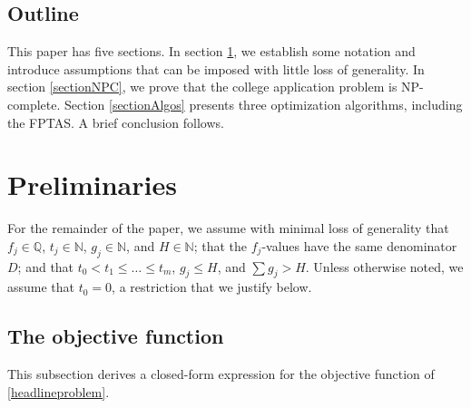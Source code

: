 \documentclass[11pt]{article} %
\theoremstyle{definition}
\begin{document}
\subsection{Outline}

This paper has five sections. In section \ref{sectionPrelims}, we establish some notation and introduce assumptions that can be imposed with little loss of generality. In section \ref{sectionNPC}, we prove that the college application problem is NP-complete. Section \ref{sectionAlgos} presents three optimization algorithms, including the FPTAS. A brief conclusion follows.

\section{Preliminaries} \label{sectionPrelims}

For the remainder of the paper, we assume with minimal loss of generality that $f_j \in \mathbb{Q}$, $t_j \in \mathbb{N}$, $g_j \in \mathbb{N}$, and $H \in \mathbb{N}$; that the $f_j$-values have the same denominator $D$; and that $t_0 < t_1 \leq \dots \leq t_m$, $g_j \leq H$, and $\sum g_j > H$. Unless otherwise noted, we assume that $t_0 = 0$, a restriction that we justify below.

\subsection{The objective function} \label{sectionObjective}

This subsection derives a closed-form expression for the objective function of \eqref{headlineproblem}.
\end{document}
